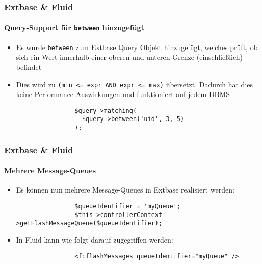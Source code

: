 
\begin{frame}[fragile]
	\frametitle{Extbase \& Fluid}
	\framesubtitle{Query-Support für \texttt{between} hinzugefügt}

	\begin{itemize}

		\item Es wurde \texttt{between} zum Extbase Query Objekt hinzugefügt,
			welches prüft, ob sich ein Wert innerhalb einer oberen und unteren
			Grenze (einschließlich) befindet

		\item Dies wird zu \texttt{(min <= expr AND expr <= max)} übersetzt.\newline
			Dadurch hat dies keine Performance-Auswirkungen und funktioniert auf jedem DBMS

			\begin{lstlisting}
				$query->matching(
				  $query->between('uid', 3, 5)
				);
			\end{lstlisting}

	\end{itemize}

\end{frame}


\begin{frame}[fragile]
	\frametitle{Extbase \& Fluid}
	\framesubtitle{Mehrere Message-Queues}

	\begin{itemize}

		\item Es können nun mehrere Message-Queues in Extbase realisiert werden:

			\begin{lstlisting}
				$queueIdentifier = 'myQueue';
				$this->controllerContext->getFlashMessageQueue($queueIdentifier);
			\end{lstlisting}

		\item In Fluid kann wie folgt darauf zugegriffen werden:

			\begin{lstlisting}
				<f:flashMessages queueIdentifier="myQueue" />
			\end{lstlisting}

	\end{itemize}

\end{frame}

